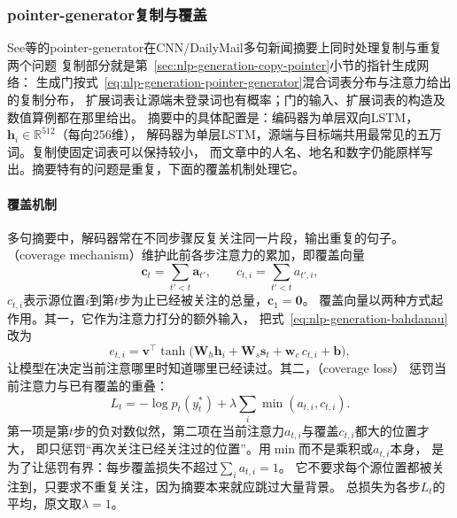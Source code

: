 \subsubsection{pointer-generator复制与覆盖}
\label{sec:nlp-generation-pointer}

See等的pointer-generator在CNN/DailyMail多句新闻摘要上同时处理复制与重复两个问题
复制部分就是第~\ref{sec:nlp-generation-copy-pointer}小节的指针生成网络：
生成门按式~\eqref{eq:nlp-generation-pointer-generator}混合词表分布与注意力给出的复制分布，
扩展词表让源端未登录词也有概率；门的输入、扩展词表的构造及数值算例都在那里给出。
摘要中的具体配置是：编码器为单层双向LSTM，$\bm h_i\in\mathbb{R}^{512}$（每向256维），
解码器为单层LSTM，源端与目标端共用最常见的五万词。复制使固定词表可以保持较小，
而文章中的人名、地名和数字仍能原样写出。摘要特有的问题是重复，下面的覆盖机制处理它。

\paragraph{覆盖机制}
多句摘要中，解码器常在不同步骤反复关注同一片段，输出重复的句子。
（coverage mechanism）维护此前各步注意力的累加，即覆盖向量
\begin{equation}
  \bm c_t=\sum_{t'<t}\bm a_{t'},\qquad c_{t,i}=\sum_{t'<t}a_{t',i},
  \label{eq:nlp-generation-coverage}
\end{equation}
$c_{t,i}$表示源位置$i$到第$t$步为止已经被关注的总量，$\bm c_1=\bm 0$。
覆盖向量以两种方式起作用。其一，它作为注意力打分的额外输入，
把式~\eqref{eq:nlp-generation-bahdanau}改为
\begin{equation}
  e_{t,i}=\bm v^{\top}\tanh\bigl(\bm W_h\bm h_i+\bm W_s\bm s_t+\bm w_c\,c_{t,i}+\bm b\bigr),
  \label{eq:nlp-generation-coverage-attention}
\end{equation}
让模型在决定当前注意哪里时知道哪里已经读过。其二，（coverage loss）
惩罚当前注意力与已有覆盖的重叠：
\begin{equation}
  L_t=-\log p_t(y^{\ast}_t)+\lambda\sum_{i}\min(a_{t,i},c_{t,i}).
  \label{eq:nlp-generation-coverage-loss}
\end{equation}
第一项是第$t$步的负对数似然，第二项在当前注意力$a_{t,i}$与覆盖$c_{t,i}$都大的位置才大，
即只惩罚“再次关注已经关注过的位置”。用$\min$而不是乘积或$a_{t,i}$本身，
是为了让惩罚有界：每步覆盖损失不超过$\sum_i a_{t,i}=1$。
它不要求每个源位置都被关注到，只要求不重复关注，因为摘要本来就应跳过大量背景。
总损失为各步$L_t$的平均，原文取$\lambda=1$。

